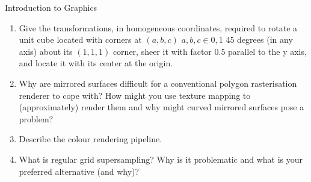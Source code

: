 \documentclass{tripos}
\begin{document}
\begin{question}[MockIA,year=2025,paper=1,question=6,author=nobody]{Introduction to Graphics}

\begin{enumerate}
\item Give the transformations, in homogeneous coordinates, required
  to rotate a unit cube located with corners at $(a,b,c)$ $a,b,c \in
  0,1$ 45 degrees (in any axis) about its $(1,1,1)$ corner, sheer it
  with factor $0.5$ parallel to the y axis, and locate it with its
  center at the origin. 

\item Why are mirrored surfaces difficult for a conventional polygon
  rasterisation renderer to cope with?  How might you use texture
  mapping to (approximately) render them and why might curved mirrored
  surfaces pose a problem? 

\item Describe the colour rendering pipeline. 

\item What is regular grid supersampling? Why is it problematic and
  what is your preferred alternative (and why)?  

\end{enumerate}
\end{question}
\eject
\end{document}
